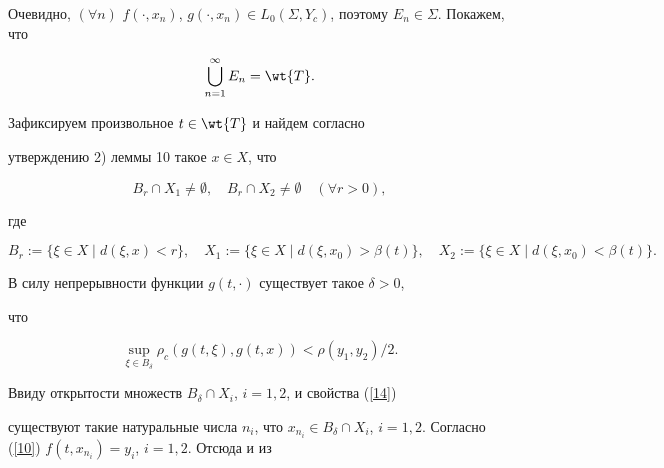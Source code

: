 Очевидно, $(\forall n)$\; $f(\cdot,x_n)$, $g(\cdot,x_n)\in L_0(\Sigma,


Y_c)$, поэтому $E_n\in\Sigma$. Покажем, что


\begin{equation}


\label{13}


\bigcup_{n=1}^\infty E_n=\wt{T}.


\end{equation}





Зафиксируем произвольное $t\in\wt{T}$ и найдем согласно


утверждению 2) леммы 10 такое $x\in X$, что


\begin{equation}


\label{14}


B_r\cap X_1\ne\emptyset, \quad


B_r\cap X_2\ne\emptyset \quad (\forall r>0),


\end{equation}


где


$$


B_r:=\{\xi\in X\mid d(\xi,x)<r\}, \quad


X_1:=\{\xi\in X\mid d(\xi,x_0)>\beta(t)\}, \quad


X_2:=\{\xi\in X\mid d(\xi,x_0)<\beta(t)\}.


$$





В силу непрерывности функции $g(t,\cdot)$ существует такое $\delta>0$,


что


\begin{equation}


\label{15}


\sup_{\xi\in B_\delta}\rho_c(g(t,\xi),g(t,x))<


\rho(y_1,y_2)/2.


\end{equation}





Ввиду открытости множеств $B_\delta\cap X_i$, $i=1,2$, и свойства (\ref{14})


существуют такие натуральные числа $n_i$, что $x_{n_i}\in B_\delta\cap


X_i$, $i=1,2$. Согласно (\ref{10}) $f(t,x_{n_i})=y_i$, $i=1,2$. Отсюда и из


